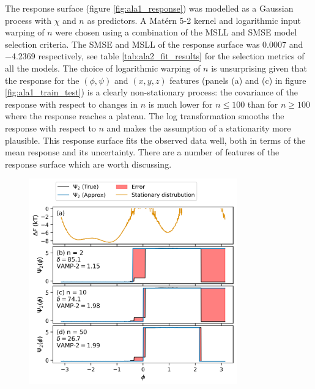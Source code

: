 The response surface (figure \ref{fig:ala1_response}) was modelled as a Gaussian process with $\chi$ and $n$ as predictors. A Mat\'{e}rn 5-2 kernel and logarithmic input warping of $n$ were chosen using a combination of the MSLL and SMSE model selection criteria. The SMSE and MSLL of the response surface was \num{0.0007} and  \num{-4.2369} respectively, see table \ref{tab:ala2_fit_results} for the selection metrics of all the models. The choice of logarithmic warping of $n$ is unsurprising given that the response for the $(\phi, \psi)$ and $(x,y,z)$ features (panels (a) and (c) in figure \ref{fig:ala1_train_test}) is a clearly non-stationary process: the covariance of the response with respect to changes in $n$ is much lower for $n\leq 100$ than for $n\geq 100$ where the response reaches a plateau. The log transformation smooths the response with respect to $n$ and makes the assumption of a stationarity more plausible.  This response surface fits the observed data well, both in terms of the mean response and its uncertainty. There are a number of features of the response surface which are worth discussing. 

\begin{figure}
    \centering
    \label{fig:ala1_evcompare}
    \includegraphics[width=0.8\textwidth]{chapters/msm_optimization/figures/ala1_ev_n_compare.png}
\end{figure}

